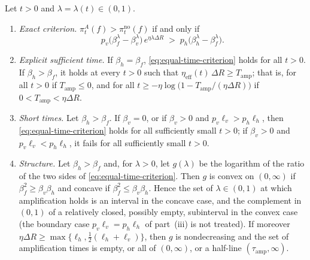 \begin{proposition}
\label{prop:equal-time}
Let $t>0$ and $\lambda=\lambda(t)\in(0,1)$.
\begin{enumerate}
\item[\textup{(i)}] \emph{Exact criterion.}
$\pi^{A}_t(f)>\pi^{\mathrm{no}}_t(f)$ if and only if
\begin{equation}\label{eq:equal-time-criterion}
p_v\bigl(\beta_f^{\lambda}-\beta_v^{\lambda}\bigr)\,e^{\eta\lambda\Delta R}
\;>\;p_h\bigl(\beta_h^{\lambda}-\beta_f^{\lambda}\bigr).
\end{equation}
\item[\textup{(ii)}] \emph{Explicit sufficient time.} If $\beta_h=\beta_f$,
\eqref{eq:equal-time-criterion} holds for all $t>0$. If $\beta_h>\beta_f$,
it holds at every $t>0$ such that
$\eta_{\mathrm{eff}}(t)\,\Delta R\ge T_{\mathrm{amp}}$; that is, for all
$t>0$ if $T_{\mathrm{amp}}\le0$, and for all
$t\ge-\eta\log\bigl(1-T_{\mathrm{amp}}/(\eta\Delta R)\bigr)$ if
$0<T_{\mathrm{amp}}<\eta\Delta R$.
\item[\textup{(iii)}] \emph{Short times.} Let $\beta_h>\beta_f$. If
$\beta_v=0$, or if $\beta_v>0$ and $p_v\ell_v>p_h\ell_h$, then
\eqref{eq:equal-time-criterion} holds for all sufficiently small $t>0$; if
$\beta_v>0$ and $p_v\ell_v<p_h\ell_h$, it fails for all sufficiently small
$t>0$.
\item[\textup{(iv)}] \emph{Structure.} Let $\beta_h>\beta_f$ and, for
$\lambda>0$, let $g(\lambda)$ be the logarithm of the ratio of the two sides
of \eqref{eq:equal-time-criterion}. Then $g$ is convex on $(0,\infty)$ if
$\beta_f^2\ge\beta_v\beta_h$ and concave if
$\beta_f^2\le\beta_v\beta_h$. Hence the set of $\lambda\in(0,1)$ at which
amplification holds is an interval in the concave case, and the complement
in $(0,1)$ of a relatively closed, possibly empty, subinterval in the convex case (the boundary case $p_v\ell_v=p_h\ell_h$ of part~(iii) is not treated). If moreover
$\eta\Delta R\ge\max\{\ell_h,\tfrac12(\ell_h+\ell_v)\}$, then $g$ is
nondecreasing and the set of amplification times is empty, or all of
$(0,\infty)$, or a half-line $(\tau_{\mathrm{amp}},\infty)$.
\end{enumerate}
\end{proposition}

